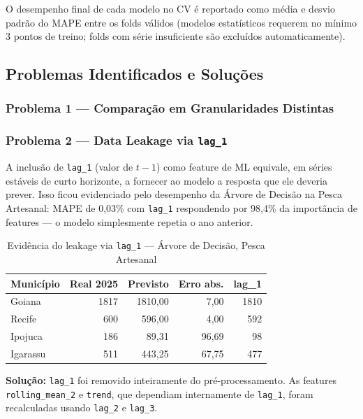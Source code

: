 \documentclass[12pt, a4paper]{article}
\begin{document}
O desempenho final de cada modelo no CV é reportado como média e desvio
padrão do MAPE entre os folds válidos (modelos estatísticos requerem
no mínimo 3 pontos de treino; folds com série insuficiente são excluídos
automaticamente).

\subsection{Problemas Identificados e Soluções}
\label{sec:leakage}

\subsubsection{Problema 1 — Comparação em Granularidades Distintas}

\subsubsection{Problema 2 — Data Leakage via \texttt{lag\_1}}

A inclusão de \texttt{lag\_1} (valor de $t-1$) como feature de ML
equivale, em séries estáveis de curto horizonte, a fornecer ao modelo
a resposta que ele deveria prever. Isso ficou evidenciado pelo desempenho
da Árvore de Decisão na Pesca Artesanal: MAPE de 0,03\% com
\texttt{lag\_1} respondendo por 98,4\% da importância de features ---
o modelo simplesmente repetia o ano anterior.

\begin{table}[H]
  \centering
  \caption{Evidência do leakage via \texttt{lag\_1} — Árvore de Decisão, Pesca Artesanal}
  \label{tab:leakage_lag1}
  \begin{tabular}{lrrrr}
    \toprule
    \textbf{Município} & \textbf{Real 2025} & \textbf{Previsto} & \textbf{Erro abs.} & \textbf{lag\_1} \\
    \midrule
    Goiana    & 1817 & 1810,00 &  7,00 & 1810 \\
    Recife    &  600 &  596,00 &  4,00 &  592 \\
    Ipojuca   &  186 &   89,31 & 96,69 &   98 \\
    Igarassu  &  511 &  443,25 & 67,75 &  477 \\
    \bottomrule
  \end{tabular}
\end{table}

\noindent\textbf{Solução:} \texttt{lag\_1} foi removido inteiramente do
pré-processamento. As features \texttt{rolling\_mean\_2} e \texttt{trend},
que dependiam internamente de \texttt{lag\_1}, foram recalculadas usando
\texttt{lag\_2} e \texttt{lag\_3}.
\end{document}
